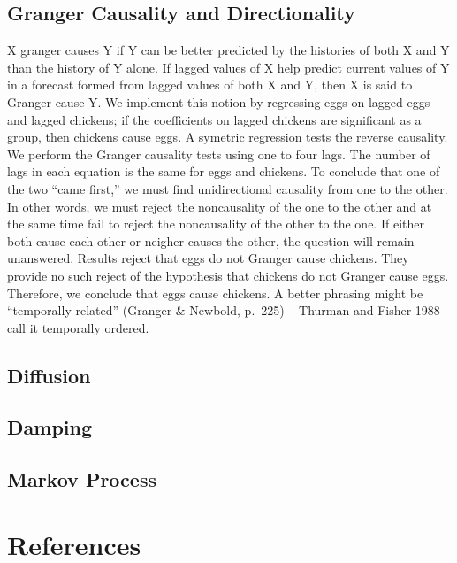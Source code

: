 \documentclass[english,,man]{apa6}
\theoremstyle{definition}
\theoremstyle{definition}
\theoremstyle{definition}
\theoremstyle{remark}
\begin{document}
\hypertarget{granger-causality-and-directionality}{%
\subsection{Granger Causality and
Directionality}\label{granger-causality-and-directionality}}

X granger causes Y if Y can be better predicted by the histories of both
X and Y than the history of Y alone. If lagged values of X help predict
current values of Y in a forecast formed from lagged values of both X
and Y, then X is said to Granger cause Y. We implement this notion by
regressing eggs on lagged eggs and lagged chickens; if the coefficients
on lagged chickens are significant as a group, then chickens cause eggs.
A symetric regression tests the reverse causality. We perform the
Granger causality tests using one to four lags. The number of lags in
each equation is the same for eggs and chickens. To conclude that one of
the two \enquote{came first,} we must find unidirectional causality from
one to the other. In other words, we must reject the noncausality of the
one to the other and at the same time fail to reject the noncausality of
the other to the one. If either both cause each other or neigher causes
the other, the question will remain unanswered. Results reject that eggs
do not Granger cause chickens. They provide no such reject of the
hypothesis that chickens do not Granger cause eggs. Therefore, we
conclude that eggs cause chickens. A better phrasing might be
\enquote{temporally related} (Granger \& Newbold, p.~225) -- Thurman and
Fisher 1988 call it temporally ordered.

\hypertarget{diffusion}{%
\subsection{Diffusion}\label{diffusion}}

\hypertarget{damping}{%
\subsection{Damping}\label{damping}}

\hypertarget{markov-process}{%
\subsection{Markov Process}\label{markov-process}}

\newpage

\hypertarget{references}{%
\section{References}\label{references}}

\setlength{\parindent}{-0.5in}
\setlength{\leftskip}{0.5in}
\end{document}
